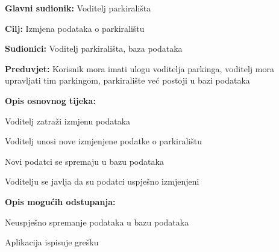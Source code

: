 				    \noindent {}
				   \begin{packed_item}
				   	
				   	\item \textbf{Glavni sudionik: }Voditelj parkirališta
				   	\item  \textbf{Cilj:} Izmjena podataka o parkiralištu
				   	\item  \textbf{Sudionici:} Voditelj parkirališta, baza podataka
				   	\item  \textbf{Preduvjet:} Korisnik mora imati ulogu voditelja parkinga, voditelj mora upravljati tim parkingom, parkiralište već postoji u bazi podataka
				   	\item  \textbf{Opis osnovnog tijeka:}
				   	
				   	\item[] \begin{packed_enum}
				   		
				   		\item Voditelj zatraži izmjenu podataka
				   		\item Voditelj unosi nove izmjenjene podatke o parkiralištu
				   		\item Novi podatci se spremaju u bazu podataka
				   		\item Voditelju se javlja da su podatci uspješno izmjenjeni
				   	\end{packed_enum}
				   	
				   	\item  \textbf{Opis mogućih odstupanja:}
				   	
				   	\item[] \begin{packed_item}
				   		
				   		
				   		
				   		\item[3.a] Neuspješno spremanje podataka u bazu podataka	
				   		\item[] \begin{packed_enum}
				   			
				   			\item Aplikacija ispisuje grešku
				   			
				   		\end{packed_enum}
				   		
				   	\end{packed_item}
				   \end{packed_item}
			    	\noindent {}
